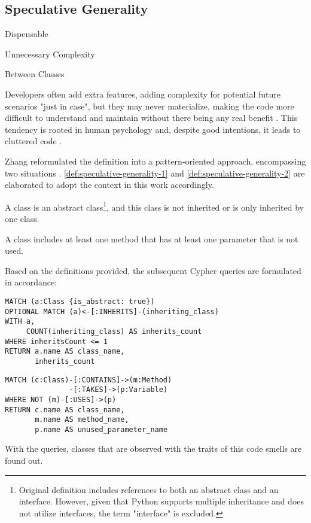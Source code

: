\subsection{Speculative Generality}

\begin{description}[align=left, labelwidth=2.4cm]
  \item [Obstruction] Dispensable
  \item [Occurence] Unnecessary Complexity
  \item [Expanse] Between Classes 
\end{description}

Developers often add extra features, adding complexity for potential future scenarios "just in case", but they may never materialize, making the code more difficult to understand and maintain without there being any real benefit \cite{Martin_2018}. This tendency is rooted in human psychology and, despite good intentions, it leads to cluttered code \cite{Jerzyk_2023}.

Zhang \etal reformulated the definition into a pattern-oriented approach, encompassing two situations \cite{Zhang_2008}. \autoref{def:speculative-generality-1} and \ref{def:speculative-generality-2} are elaborated to adopt the context in this work accordingly.

\begin{definition}
A class is an abstract class\footnote{Original definition includes references to both an abstract class and an interface. However, given that Python supports multiple inheritance and does not utilize interfaces, the term "interface" is excluded.}, and this class is not inherited or is only inherited by one class.
\label{def:speculative-generality-1}
\end{definition}

\begin{definition}
A class includes at least one method that has at least one parameter that is not used.
\label{def:speculative-generality-2}
\end{definition}

Based on the definitions provided, the subsequent Cypher queries are formulated in accordance:

\begin{verbatim}
MATCH (a:Class {is_abstract: true})
OPTIONAL MATCH (a)<-[:INHERITS]-(inheriting_class)
WITH a, 
     COUNT(inheriting_class) AS inherits_count
WHERE inheritsCount <= 1
RETURN a.name AS class_name, 
       inherits_count
\end{verbatim}


\begin{verbatim}
MATCH (c:Class)-[:CONTAINS]->(m:Method)
               -[:TAKES]->(p:Variable)
WHERE NOT (m)-[:USES]->(p)
RETURN c.name AS class_name, 
       m.name AS method_name, 
       p.name AS unused_parameter_name
\end{verbatim}

With the queries, classes that are observed with the traits of this code smells are found out.
